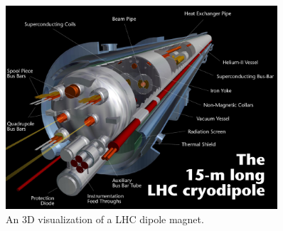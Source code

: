 \begin{figure}
 \centering
 \includegraphics[width=0.9\textwidth]{LHC_fig/cryodipole.jpg}
 \caption{An 3D visualization of a LHC dipole magnet.\label{fig:magnet2} }
\end{figure}

